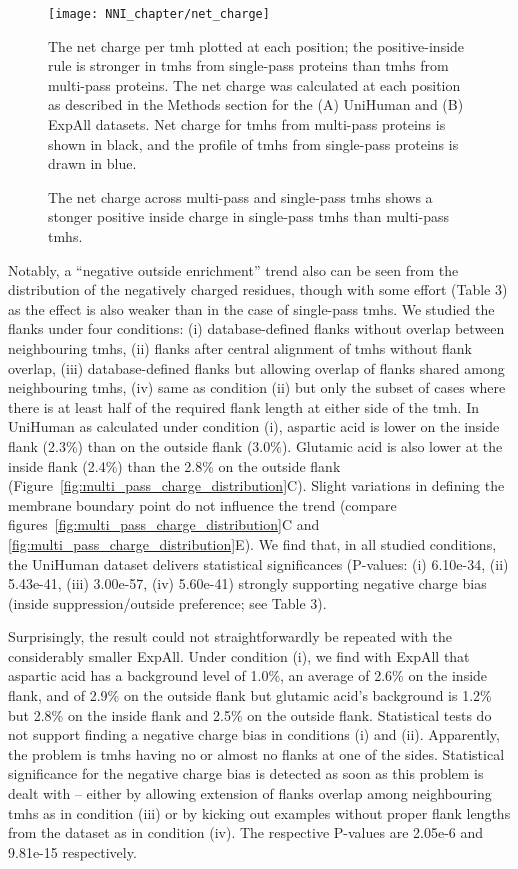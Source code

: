 \begin{figure}[!ht]
\centering
\texttt{[image: NNI\_chapter/net\_charge]}
\caption{The net charge across multi-pass and single-pass \gls{tmh}s shows a stonger positive inside charge in single-pass \gls{tmh}s than multi-pass \gls{tmh}s.}
\medskip
\small
\justify
The net charge per \gls{tmh} plotted at each position; the positive-inside rule is stronger in \gls{tmh}s from single-pass proteins than \gls{tmh}s from multi-pass proteins. The net charge was calculated at each position as described in the Methods section for the (A) UniHuman and (B) ExpAll datasets. Net charge for \gls{tmh}s from multi-pass proteins is shown in black, and the profile of \gls{tmh}s from single-pass proteins is drawn in blue.
\label{fig:net_charge}
\end{figure}

Notably, a ``negative outside enrichment'' trend also can be seen from the distribution of the negatively charged residues, though with some effort (Table 3) as the effect is also weaker than in the case of single-pass \gls{tmh}s. We studied the flanks under four conditions: (i) database-defined flanks without overlap between neighbouring \gls{tmh}s, (ii) flanks after central alignment of \gls{tmh}s without flank overlap, (iii) database-defined flanks but allowing overlap of flanks shared among neighbouring \gls{tmh}s, (iv) same as condition (ii) but only the subset of cases where there is at least half of the required flank length at either side of the \gls{tmh}. In UniHuman as calculated under condition (i), aspartic acid is lower on the inside flank (2.3\%) than on the outside flank (3.0\%). Glutamic acid is also lower at the inside flank (2.4\%) than the 2.8\% on the outside flank (Figure~\ref{fig:multi_pass_charge_distribution}C). Slight variations in defining the membrane boundary point do not influence the trend (compare figures~\ref{fig:multi_pass_charge_distribution}C and \ref{fig:multi_pass_charge_distribution}E). We find that, in all studied conditions, the UniHuman dataset delivers statistical significances (P-values: (i) 6.10e-34, (ii) 5.43e-41, (iii) 3.00e-57, (iv) 5.60e-41) strongly supporting negative charge bias (inside suppression/outside preference; see Table 3).

Surprisingly, the result could not straightforwardly be repeated with the considerably smaller ExpAll. Under condition (i), we find with ExpAll that aspartic acid has a background level of 1.0\%, an average of 2.6\% on the inside flank, and of 2.9\% on the outside flank but glutamic acid’s background is 1.2\% but 2.8\% on the inside flank and 2.5\% on the outside flank. Statistical tests do not support finding a negative charge bias in conditions (i) and (ii). Apparently, the problem is \gls{tmh}s having no or almost no flanks at one of the sides. Statistical significance for the negative charge bias is detected as soon as this problem is dealt with – either by allowing extension of flanks overlap among neighbouring \gls{tmh}s as in condition (iii) or by kicking out examples without proper flank lengths from the dataset as in condition (iv). The respective P-values are 2.05e-6 and 9.81e-15 respectively.

